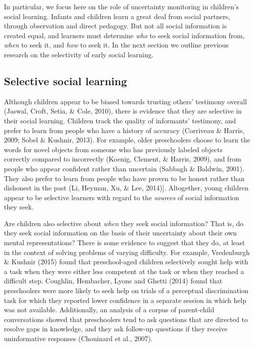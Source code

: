 \documentclass[a4paper,man,apacite,floatsintext]{apa6}
\begin{document}
In particular, we focus here on the role of uncertainty monitoring in
children's social learning. Infants and children learn a great deal from
social partners, through observation and direct pedagogy. But not all
social information is created equal, and learners must determine
\emph{who} to seek social information from, \emph{when} to seek it, and
\emph{how} to seek it. In the next section we outline previous research
on the selectivity of early social learning.

\subsection{Selective social learning}\label{selective-social-learning}

Although children appear to be biased towards trusting others' testimony
overall (Jaswal, Croft, Setia, \& Cole, 2010), there is evidence that
they are selective in their social learning. Children track the quality
of informants' testimony, and prefer to learn from people who have a
history of accuracy (Corriveau \& Harris, 2009; Sobel \& Kushnir, 2013).
For example, older preschoolers choose to learn the words for novel
objects from someone who has previously labeled objects correctly
compared to incorrectly (Koenig, Clement, \& Harris, 2009), and from
people who appear confident rather than uncertain (Sabbagh \& Baldwin,
2001). They also prefer to learn from people who have proven to be
honest rather than dishonest in the past (Li, Heyman, Xu, \& Lee,
2014){]}. Altogether, young children appear to be selective learners
with regard to the \emph{sources} of social information they seek.

Are children also selective about \emph{when} they seek social
information? That is, do they seek social information on the basis of
their uncertainty about their own mental representations? There is some
evidence to suggest that they do, at least in the context of solving
problems of varying difficulty. For example, Vredenburgh \& Kushnir
(2015) found that preschool-aged children selectively sought help with a
task when they were either less competent at the task or when they
reached a difficult step. Coughlin, Hembacher, Lyons and Ghetti (2014)
found that preschoolers were more likely to seek help on trials of a
perceptual discrimination task for which they reported lower confidence
in a separate session in which help was not available. Additionally, an
analysis of a corpus of parent-child conversations showed that
preschoolers tend to ask questions that are directed to resolve gaps in
knowledge, and they ask follow-up questions if they receive
uninformative responses (Chouinard et al., 2007).
\end{document}
